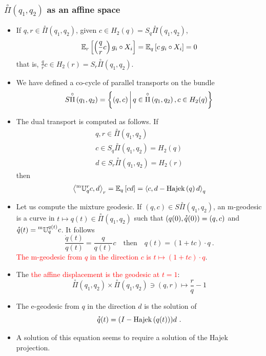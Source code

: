 \documentclass[xcolor=svgnames]{beamer}
\DeclareMathOperator{\Hajek}{Hajek}
\newcommand{\hajekof}[1]{\Hajek\left(#1\right)}
\newcommand{\openplan}[2]{\overset{\circ}\Pi\left(#1,#2\right)}
\newcommand{\rosso}[1]{\textcolor{red}{#1}}
\renewcommand{\emph}{\rosso}
\begin{document}
\begin{frame}\small\frametitle{$\openplan{q_1}{q_2}$ as an affine space}
\begin{itemize}
\item If $q , r \in \openplan {q_1} {q_2}$, given $c \in H_2(q) = S_q \openplan {q_1}{q_2}$,
\begin{equation*}
\operatorname{\mathbb E}_{r}\left[\left(\frac q r c\right) g_i \circ X_i\right] = \operatorname{\mathbb E}_{q}\left[c \,  g_i \circ X_i\right] = 0
\end{equation*}
that is, $\frac q r c \in H_2(r) = S_r \openplan {q_1}{q_2}$.
\item We have defined a co-cycle 
of parallel transports on the bundle
\begin{equation*}
    S \openplan {q_1}{q_2} = \setof {(q,c)}{ q \in \openplan {q_1}{q_2}, c \in H_2(q)} 
\end{equation*}
\item The dual transport is computed as follows. If
\begin{gather*}
  q, r \in \openplan {q_1}{q_2} \\
  c \in S_q \openplan {q_1}{q_2} = H_2(q) \\
  d \in S_r \openplan {q_1}{q_2} = H_2(r)
\end{gather*}
then
\begin{equation*}
\scalarat r {\mtransport q r c} d = \expectat q {cd} = \scalarat q c {d - \hajekof q d}
\end{equation*}
\item Let us compute the mixture geodesic. If $(q,c) \in S \openplan {q_1}{q_2}$, an m-geodesic is a curve in $t \mapsto q(t) \in \openplan {q_1}{q_2}$ such that $(q(0),\accentset{\star}{q}(0)) = (q,c)$ and $\accentset{\star}{q}(t) = \prescript{\text{m}}{} {\mathbb U} _ {q} ^ {q(t)} c$. It follows
\begin{equation*}
    \frac {\dot q(t)}{q(t)} = \frac q {q(t)} c \quad \text{then} \quad q(t) = (1 +tc) \cdot q \ .
\end{equation*}
\emph{The m-geodesic from $q$ in the direction $c$ is $t \mapsto (1+tc)\cdot q$}. 
\item The \emph{the affine displacement is the geodesic at $t=1$}:
\begin{equation*}
 \openplan {q_1}{q_2} \times  \openplan {q_1}{q_2} \ni (q,r) \mapsto \frac r q - 1
\end{equation*}
\item The e-geodesic from $q$ in the direction $d$ is the solution of
\begin{equation*}
\velocity q(t) = (I - \hajekof{q(t)})d \ .
\end{equation*}
\item A solution of this equation seems to require a solution of the Hajek projection.
\end{itemize}

\end{frame}
\end{document}
